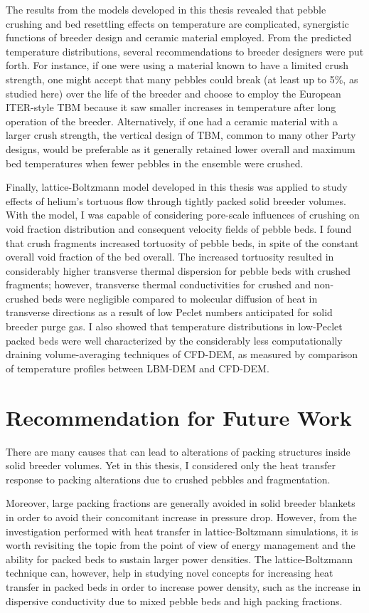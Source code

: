 The results from the models developed in this thesis revealed that pebble crushing and bed resettling effects on temperature are complicated, synergistic functions of breeder design and ceramic material employed. From the predicted temperature distributions, several recommendations to breeder designers were put forth. For instance, if one were using a material known to have a limited crush strength, one might accept that many pebbles could break (at least up to 5\%, as studied here) over the life of the breeder and choose to employ the European ITER-style TBM because it saw smaller increases in temperature after long operation of the breeder. Alternatively, if one had a ceramic material with a larger crush strength, the vertical design of TBM, common to many other Party designs, would be preferable as it generally retained lower overall and maximum bed temperatures when fewer pebbles in the ensemble were crushed.

Finally, lattice-Boltzmann model developed in this thesis was applied to study effects of helium's tortuous flow through tightly packed solid breeder volumes. With the model, I was capable of considering pore-scale influences of crushing on void fraction distribution and consequent velocity fields of pebble beds. I found that crush fragments increased tortuosity of pebble beds, in spite of the constant overall void fraction of the bed overall. The increased tortuosity resulted in considerably higher transverse thermal dispersion for pebble beds with crushed fragments; however, transverse thermal conductivities for crushed and non-crushed beds were negligible compared to molecular diffusion of heat in transverse directions as a result of low Peclet numbers anticipated for solid breeder purge gas. I also showed that temperature distributions in low-Peclet packed beds were well characterized by the considerably less computationally draining volume-averaging techniques of CFD-DEM, as measured by comparison of temperature profiles between LBM-DEM and CFD-DEM.

\section{Recommendation for Future Work}
There are many causes that can lead to alterations of packing structures inside solid breeder volumes. Yet in this thesis, I considered only the heat transfer response to packing alterations due to crushed pebbles and fragmentation.


Moreover, large packing fractions are generally avoided in solid breeder blankets in order to avoid their concomitant increase in pressure drop. However, from the investigation performed with heat transfer in lattice-Boltzmann simulations, it is worth revisiting the topic from the point of view of energy management and the ability for packed beds to sustain larger power densities. The lattice-Boltzmann technique can, however, help in studying novel concepts for increasing heat transfer in packed beds in order to increase power density, such as the increase in dispersive conductivity due to mixed pebble beds and high packing fractions.
